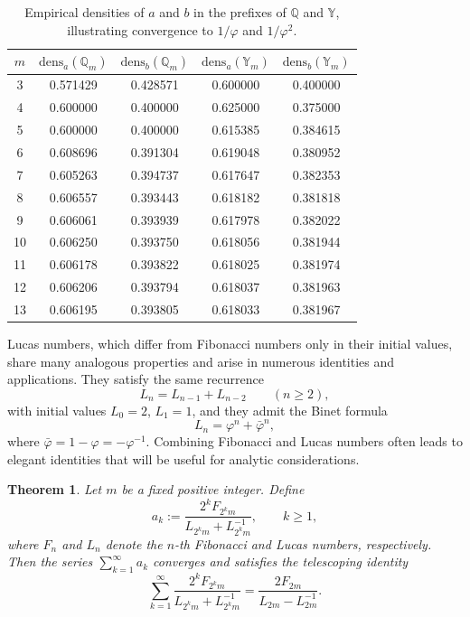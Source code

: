 \documentclass[12pt, a4paper]{article}
\newtheorem{theorem}{Theorem}[section]
\newcommand{\dens}{\mathrm{dens}}
\begin{document}
\begin{table}[H]
\centering
\begin{tabular}{|c|c|c|c|c|}
\hline
$m$ & $\dens_a(\mathbb{Q}_m)$ & $\dens_b(\mathbb{Q}_m)$ & $\dens_a(\mathbb{Y}_m)$ & $\dens_b(\mathbb{Y}_m)$ \\ \hline
 3 & 0.571429 & 0.428571 & 0.600000 & 0.400000 \\ \hline
 4 & 0.600000 & 0.400000 & 0.625000 & 0.375000 \\ \hline
 5 & 0.600000 & 0.400000 & 0.615385 & 0.384615 \\ \hline
 6 & 0.608696 & 0.391304 & 0.619048 & 0.380952 \\ \hline
 7 & 0.605263 & 0.394737 & 0.617647 & 0.382353 \\ \hline
 8 & 0.606557 & 0.393443 & 0.618182 & 0.381818 \\ \hline
 9 & 0.606061 & 0.393939 & 0.617978 & 0.382022 \\ \hline
10 & 0.606250 & 0.393750 & 0.618056 & 0.381944 \\ \hline
11 & 0.606178 & 0.393822 & 0.618025 & 0.381974 \\ \hline
12 & 0.606206 & 0.393794 & 0.618037 & 0.381963 \\ \hline
13 & 0.606195 & 0.393805 & 0.618033 & 0.381967 \\ \hline
\end{tabular}
\caption{Empirical densities of $a$ and $b$ in the prefixes of $\mathbb{Q}$ and $\mathbb{Y}$, illustrating convergence to $1/\varphi$ and $1/\varphi^2$.}
\label{tab002densitiesASm}
\end{table}

\medskip

Lucas numbers, which differ from Fibonacci numbers only in their initial values, share many analogous properties and arise in numerous identities and applications. They satisfy the same recurrence
\[
L_n = L_{n-1} + L_{n-2} \qquad (n \ge 2),
\]
with initial values $L_0 = 2$, $L_1 = 1$, and they admit the Binet formula
\[
L_n = \varphi^n + \bar{\varphi}^n,
\]
where $\bar{\varphi} = 1-\varphi = -\varphi^{-1}$. Combining Fibonacci and Lucas numbers often leads to elegant identities that will be useful for analytic considerations.

\begin{theorem}\label{fiblucasn1}
Let $m$ be a fixed positive integer. Define
\[
a_k := \frac{2^k F_{2^k m}}{L_{2^k m} + L_{2^k m}^{-1}}, \qquad k \ge 1,
\]
where $F_n$ and $L_n$ denote the $n$-th Fibonacci and Lucas numbers, respectively. Then the series $\sum_{k=1}^{\infty} a_k$ converges and satisfies the telescoping identity
\begin{equation}\label{eq0fiblucasn1}
\sum_{k=1}^{\infty} \frac{2^k F_{2^k m}}{L_{2^k m} + L_{2^k m}^{-1}}
= \frac{2 F_{2m}}{L_{2m} - L_{2m}^{-1}}.
\end{equation}
\end{theorem}
\end{document}
